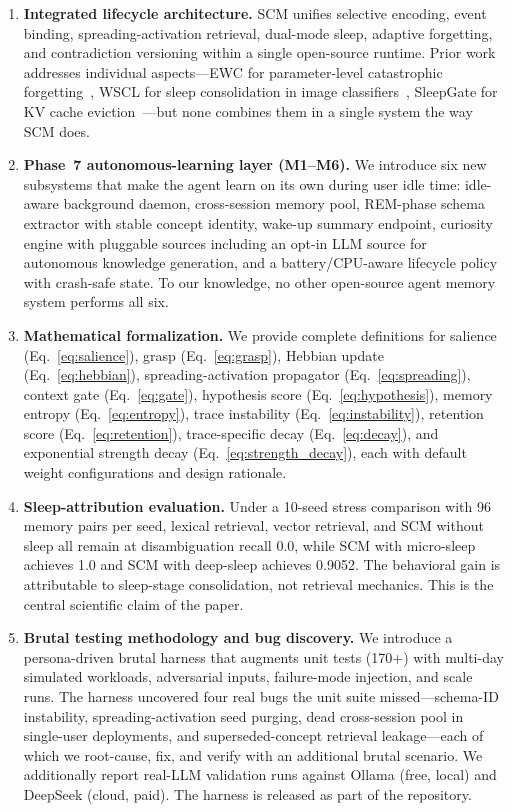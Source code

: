 \documentclass[11pt,twocolumn]{article}
\begin{document}
\begin{enumerate}[leftmargin=*]
\item \textbf{Integrated lifecycle architecture.} SCM unifies selective encoding, event binding, spreading-activation retrieval, dual-mode sleep, adaptive forgetting, and contradiction versioning within a single open-source runtime. Prior work addresses individual aspects---EWC for parameter-level catastrophic forgetting~\cite{kirkpatrick2017ewc}, WSCL for sleep consolidation in image classifiers~\cite{sorrenti2024wscl}, SleepGate for KV cache eviction~\cite{xie2026sleepgate}---but none combines them in a single system the way SCM does.
\item \textbf{Phase~7 autonomous-learning layer (M1--M6).} We introduce six new subsystems that make the agent learn on its own during user idle time: idle-aware background daemon, cross-session memory pool, REM-phase schema extractor with stable concept identity, wake-up summary endpoint, curiosity engine with pluggable sources including an opt-in LLM source for autonomous knowledge generation, and a battery/CPU-aware lifecycle policy with crash-safe state. To our knowledge, no other open-source agent memory system performs all six.
\item \textbf{Mathematical formalization.} We provide complete definitions for salience (Eq.~\ref{eq:salience}), grasp (Eq.~\ref{eq:grasp}), Hebbian update (Eq.~\ref{eq:hebbian}), spreading-activation propagator (Eq.~\ref{eq:spreading}), context gate (Eq.~\ref{eq:gate}), hypothesis score (Eq.~\ref{eq:hypothesis}), memory entropy (Eq.~\ref{eq:entropy}), trace instability (Eq.~\ref{eq:instability}), retention score (Eq.~\ref{eq:retention}), trace-specific decay (Eq.~\ref{eq:decay}), and exponential strength decay (Eq.~\ref{eq:strength_decay}), each with default weight configurations and design rationale.
\item \textbf{Sleep-attribution evaluation.} Under a 10-seed stress comparison with 96 memory pairs per seed, lexical retrieval, vector retrieval, and SCM without sleep all remain at disambiguation recall 0.0, while SCM with micro-sleep achieves 1.0 and SCM with deep-sleep achieves 0.9052. The behavioral gain is attributable to sleep-stage consolidation, not retrieval mechanics. This is the central scientific claim of the paper.
\item \textbf{Brutal testing methodology and bug discovery.} We introduce a persona-driven brutal harness that augments unit tests (170+) with multi-day simulated workloads, adversarial inputs, failure-mode injection, and scale runs. The harness uncovered four real bugs the unit suite missed---schema-ID instability, spreading-activation seed purging, dead cross-session pool in single-user deployments, and superseded-concept retrieval leakage---each of which we root-cause, fix, and verify with an additional brutal scenario. We additionally report real-LLM validation runs against Ollama (free, local) and DeepSeek (cloud, paid). The harness is released as part of the repository.
\end{enumerate}
\end{document}
